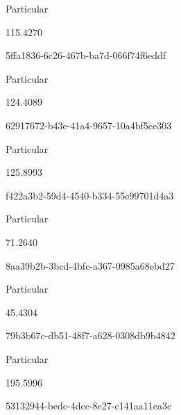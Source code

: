 \documentclass[
  11pt,
  a4paper,
  DIV=11,
  numbers=noendperiod]{scrartcl}
\begin{document}
\n      

Particular

\n      

115.4270

\n    

\n    

\n      

5ffa1836-6c26-467b-ba7d-066f74f6eddf

\n      

Particular

\n      

124.4089

\n    

\n    

\n      

62917672-b43e-41a4-9657-10a4bf5ce303

\n      

Particular

\n      

125.8993

\n    

\n    

\n      

f422a3b2-59d4-4540-b334-55e99701d4a3

\n      

Particular

\n      

71.2640

\n    

\n    

\n      

8aa39b2b-3bcd-4bfc-a367-0985a68ebd27

\n      

Particular

\n      

45.4304

\n    

\n    

\n      

79b3b67c-db51-48f7-a628-0308db9b4842

\n      

Particular

\n      

195.5996

\n    

\n    

\n      

53132944-bedc-4dcc-8e27-c141aa11ea3c

\n      
\end{document}
